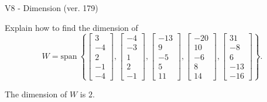 \begin{exercise}
  \begin{exerciseTitle}V8 - Dimension (ver. 179)\end{exerciseTitle}
  \begin{exerciseStatement}
    Explain how to find the dimension of 
\[W=\mathrm{span}\ \left\{\left[\begin{array}{r}
3 \\
-4 \\
2 \\
-1 \\
-4
\end{array}\right] , \left[\begin{array}{r}
-4 \\
-3 \\
1 \\
2 \\
-1
\end{array}\right] , \left[\begin{array}{r}
-13 \\
9 \\
-5 \\
5 \\
11
\end{array}\right] , \left[\begin{array}{r}
-20 \\
10 \\
-6 \\
8 \\
14
\end{array}\right] , \left[\begin{array}{r}
31 \\
-8 \\
6 \\
-13 \\
-16
\end{array}\right]\right\}.\]



  \end{exerciseStatement}
  \begin{exerciseAnswer}
   The dimension of \(W\) is  \(2\).
  


  \end{exerciseAnswer}
\end{exercise}